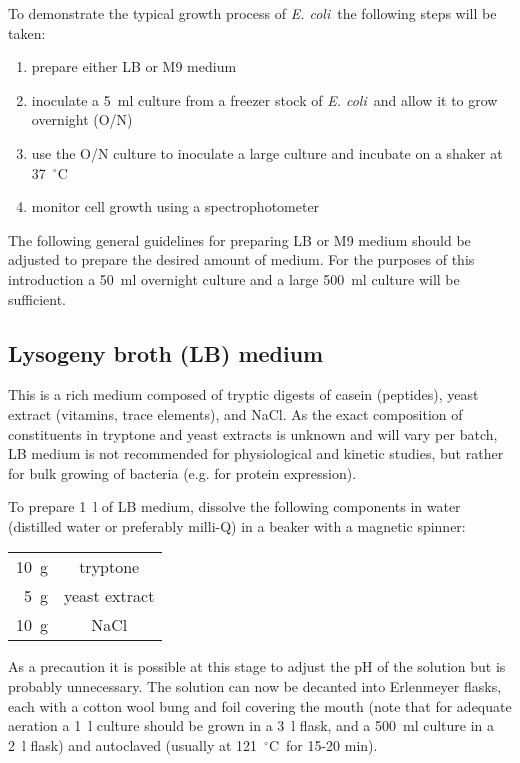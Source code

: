 \documentclass[a4paper]{article}
\newcommand{\dc}{~$^{\circ}$C}
\newcommand{\ec}{\textit{E. coli}}
\begin{document}
\begin{multicols}{2}
To demonstrate the typical growth process of \ec\ the following steps will be
taken:

\begin{enumerate}
\item prepare either LB or M9 medium
\item inoculate a 5~ml culture from a freezer stock of \ec\ and allow it to grow overnight (O/N)
\item use the O/N culture to inoculate a large culture and incubate on a shaker at 37\dc
\item monitor cell growth using a spectrophotometer
\end{enumerate}

The following general guidelines for preparing LB or M9 medium should be
adjusted to prepare the desired amount of medium. For the purposes of this
introduction a 50~ml overnight culture and a large 500~ml culture will be
sufficient.


\subsection{Lysogeny broth (LB) medium} 

This is a rich medium composed of tryptic digests of casein (peptides), yeast
extract (vitamins, trace elements), and NaCl. As the exact composition of
constituents in tryptone and yeast extracts is unknown and will vary per batch,
LB medium is not recommended for physiological and kinetic studies, but rather
for bulk growing of bacteria (e.g. for protein expression).

To prepare 1~l of LB medium, dissolve the following components in water
(distilled water or preferably milli-Q) in a beaker with a magnetic spinner:

\begin{center}
\begin{tabular}[h]{rc} \toprule
10~g    &tryptone \\ 
5~g     &yeast extract\\ 
10~g    &NaCl\\ \bottomrule
\end{tabular}
\end{center}

As a precaution it is possible at this stage to adjust the pH of the solution
but is probably unnecessary. The solution can now be decanted into Erlenmeyer
flasks, each with a cotton wool bung and foil covering the mouth (note that for
adequate aeration a 1~l culture should be grown in a 3~l flask, and
a 500~ml culture in a 2~l flask) and autoclaved (usually at 121\dc\ for 15-20
min).


\end{multicols}
\end{document}
